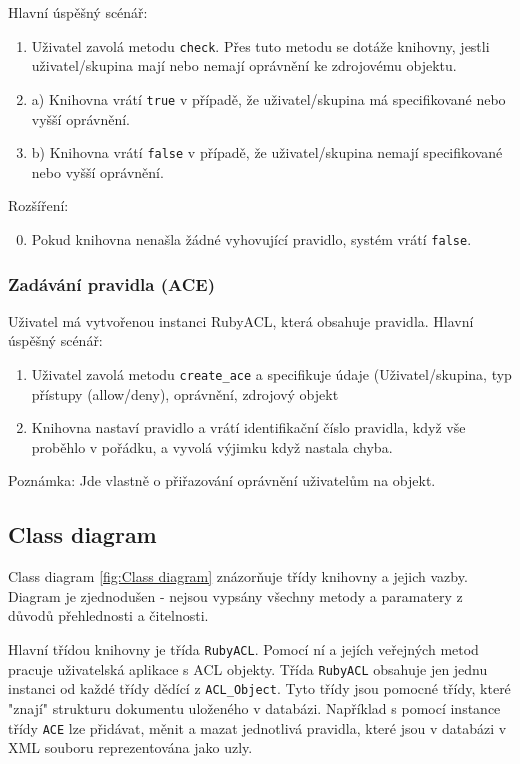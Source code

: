 Hlavní úspěšný scénář:
\begin{enumerate}
\item Uživatel zavolá metodu \verb|check|. Přes tuto metodu se dotáže knihovny, jestli uživatel/skupina mají nebo nemají oprávnění ke zdrojovému objektu.
\item a) Knihovna vrátí \verb|true| v případě, že uživatel/skupina má specifikované nebo vyšší oprávnění.
\setcounter{enumi}{1}
\item b) Knihovna vrátí \verb|false| v případě, že uživatel/skupina nemají specifikované nebo vyšší oprávnění.
\end{enumerate}
Rozšíření:
\begin{enumerate}
\setcounter{enumi}{-1}
\item Pokud knihovna nenašla žádné vyhovující pravidlo, systém vrátí \verb|false|.
\end{enumerate}


\subsubsection{Zadávání pravidla (ACE)}
Uživatel má vytvořenou instanci RubyACL, která obsahuje pravidla.
Hlavní úspěšný scénář:
\begin{enumerate}
\item Uživatel zavolá metodu \verb|create_ace| a specifikuje údaje (Uživatel/skupina, typ přístupy (allow/deny), oprávnění, zdrojový objekt
\item Knihovna nastaví pravidlo a vrátí identifikační číslo pravidla, když vše proběhlo v pořádku, a vyvolá výjimku když nastala chyba.
\end{enumerate}
Poznámka: Jde vlastně o přiřazování oprávnění uživatelům na objekt.


\subsection{Class diagram}
Class diagram \ref{fig:Class diagram} znázorňuje třídy knihovny a jejich vazby. Diagram je zjednodušen - nejsou vypsány všechny metody a paramatery z důvodů přehlednosti a čitelnosti. 

Hlavní třídou knihovny je třída \verb|RubyACL|. Pomocí ní a jejích veřejných metod pracuje uživatelská aplikace s ACL objekty. Třída \verb|RubyACL| obsahuje jen jednu instanci od každé třídy dědící z \verb|ACL_Object|. Tyto třídy jsou pomocné třídy, které "znají" strukturu dokumentu uloženého v databázi. Například s pomocí instance třídy \verb|ACE| lze přidávat, měnit a mazat jednotlivá pravidla, které jsou v databázi v XML souboru reprezentována jako uzly.

